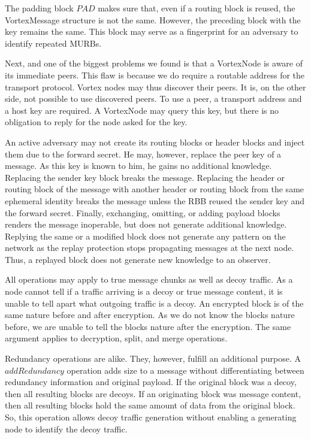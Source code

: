 \documentclass[10pt,journal,compsoc]{IEEEtran}
\begin{document}
The padding block $PAD$ makes sure that, even if a routing block is reused, the VortexMessage structure is not the same. However, the preceding block with the key remains the same. This block may serve as a fingerprint for an adversary to identify repeated MURBs.

Next, and one of the biggest problems we found is that a VortexNode is aware of its immediate peers. This flaw is because we do require a routable address for the transport protocol. Vortex nodes may thus discover their peers. It is, on the other side, not possible to use discovered peers. To use a peer, a transport address and a host key are required. A VortexNode may query this key, but there is no obligation to reply for the node asked for the key.

An active adversary may not create its routing blocks or header blocks and inject them due to the forward secret. He may, however, replace the peer key of a message. As this key is known to him, he gains no additional knowledge. Replacing the sender key block breaks the message. Replacing the header or routing block of the message with another header or routing block from the same ephemeral identity breaks the message unless the RBB reused the sender key and the forward secret. Finally, exchanging, omitting, or adding payload blocks renders the message inoperable, but does not generate additional knowledge. Replying the same or a modified block does not generate any pattern on the network as the replay protection stops propagating messages at the next node. Thus, a replayed block does not generate new knowledge to an observer.

All operations may apply to true message chunks as well as decoy traffic. As a node cannot tell if a traffic arriving is a decoy or true message content, it is unable to tell apart what outgoing traffic is a decoy. An encrypted block is of the same nature before and after encryption. As we do not know the blocks nature before, we are unable to tell the blocks nature after the encryption. The same argument applies to decryption, split, and merge operations. 

Redundancy operations are alike. They, however, fulfill an additional purpose. A $addRedundancy$ operation adds size to a message without differentiating between redundancy information and original payload. If the original block was a decoy, then all resulting blocks are decoys. If an originating block was message content, then all resulting blocks hold the same amount of data from the original block. So, this operation allows decoy traffic generation without enabling a generating node to identify the decoy traffic.
\end{document}
